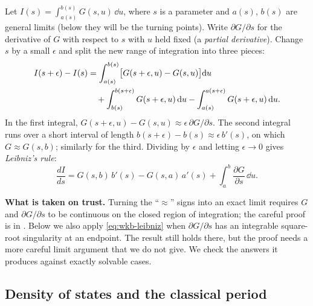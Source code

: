 Let $I(s)=\int_{a(s)}^{b(s)}G(s,u)\,\dd u$, where $s$ is a parameter and $a(s)$, $b(s)$ are general limits (below they will be the turning points). Write $\partial G/\partial s$ for the derivative of $G$ with respect to $s$ with $u$ held fixed (a \emph{partial derivative}). Change $s$ by a small $\epsilon$ and split the new range of integration into three pieces:
\begin{align}
I(s+\epsilon)-I(s)
&=\int_{a(s)}^{b(s)}\bigl[G(s+\epsilon,u)-G(s,u)\bigr]\mathrm{d} u\notag\\
&\quad+\int_{b(s)}^{b(s+\epsilon)}G(s+\epsilon,u)\,\mathrm{d} u-\int_{a(s)}^{a(s+\epsilon)}G(s+\epsilon,u)\,\mathrm{d} u .
\end{align}
In the first integral, $G(s+\epsilon,u)-G(s,u)\approx\epsilon\,\partial G/\partial s$. The second integral runs over a short interval of length $b(s+\epsilon)-b(s)\approx\epsilon\,b'(s)$, on which $G\approx G(s,b)$; similarly for the third. Dividing by $\epsilon$ and letting $\epsilon\to0$ gives \emph{Leibniz's rule}:
\begin{equation}
\frac{dI}{ds}=G(s,b)\,b'(s)-G(s,a)\,a'(s)+\int_{a}^{b}\frac{\partial G}{\partial s}\,\dd u .
\label{eq:wkb-leibniz}
\end{equation}

\begin{beyond}
\textbf{What is taken on trust.} Turning the ``$\approx$'' signs into an exact limit requires $G$ and $\partial G/\partial s$ to be continuous on the closed region of integration; the careful proof is in \cite{rhb}. Below we also apply \cref{eq:wkb-leibniz} when $\partial G/\partial s$ has an integrable square-root singularity at an endpoint. The result still holds there, but the proof needs a more careful limit argument that we do not give. We check the answers it produces against exactly solvable cases.
\end{beyond}

\subsection{Density of states and the classical period}

